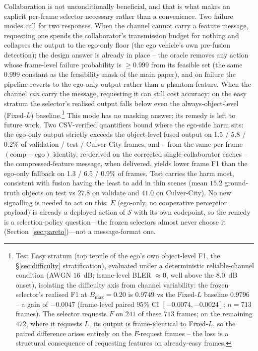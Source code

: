 \documentclass[journal]{IEEEtran}
\begin{document}
Collaboration is not unconditionally beneficial, and that is what makes an explicit per-frame selector necessary rather than a convenience. Two failure modes call for two responses. When the channel cannot carry a feature message, requesting one spends the collaborator's transmission budget for nothing and collapses the output to the ego-only floor (the ego vehicle's own pre-fusion detection); the design answer is already in place -- the oracle removes any action whose frame-level failure probability is $\ge 0.999$ from its feasible set (the same $0.999$ constant as the feasibility mask of the main paper), and on failure the pipeline reverts to the ego-only output rather than a phantom feature. When the channel \emph{can} carry the message, requesting it can still cost accuracy: on the easy stratum the selector's realised output falls below even the always-object-level (Fixed-$L$) baseline.\footnote{Test Easy stratum (top tercile of the ego's own object-level F1, the \S\ref{sec:difficulty} stratification), evaluated under a deterministic reliable-channel condition (AWGN $16$~dB; frame-level BLER ${\approx}0$, well above the $8.0$~dB onset), isolating the difficulty axis from channel variability: the frozen selector's realised F1 at $B_{\max}=0.20$ is $0.9749$ vs the Fixed-$L$ baseline $0.9796$ -- a gain of $-0.0047$ (frame-level paired $95\%$ CI $[-0.0074,-0.0024]$; $n=713$ frames). The selector requests $F$ on $241$ of these $713$ frames; on the remaining $472$, where it requests $L$, its output is frame-identical to Fixed-$L$, so the paired difference arises entirely on the $F$-request frames -- the loss is a structural consequence of requesting features on already-easy frames.} This mode has no masking answer; its remedy is left to future work. Two CSV-verified quantifiers bound where the ego-side harm sits: the ego-only output strictly exceeds the object-level fused output on 1.5 / 5.8 / 0.2\% of validation / test / Culver-City frames, and -- from the same per-frame $(\mathrm{comp}-\mathrm{ego})$ identity, re-derived on the corrected single-collaborator caches -- the compressed-feature message, when delivered, yields lower frame F1 than the ego-only fallback on 1.3 / 6.5 / 0.9\% of frames. Test carries the harm most, consistent with fusion having the least to add in thin scenes (mean $15.2$ ground-truth objects on test vs $27.8$ on validate and $41.0$ on Culver-City). No new signalling is needed to act on this: $E$ (ego-only, no cooperative perception payload) is already a deployed action of $\mathcal{S}$ with its own codepoint, so the remedy is a selection-policy question---the frozen selectors almost never choose it (Section~\ref{sec:pareto})---not a message-format one.
\end{document}
